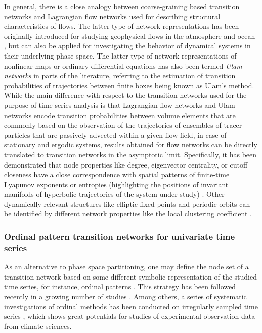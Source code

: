 In general, there is a close analogy between coarse-graining based transition networks and Lagrangian flow networks \cite{Lindner2017,Donner2019} used for describing structural characteristics of flows. The latter type of network representations has been originally introduced for studying geophysical flows in the atmosphere and ocean \cite{Rossi2015,Ser-Giacomi2015}, but can also be applied for investigating the behavior of dynamical systems in their underlying phase space. The latter type of network representations of nonlinear maps or ordinary differential equations has also been termed \emph{Ulam networks} \cite{Shepelyansky2010,Ermann2010,Chakhmakhchyan2013,Ermann2015,Frahm2018} in parts of the literature, referring to the estimation of transition probabilities of trajectories between finite boxes being known as Ulam's method. While the main difference with respect to the transition networks used for the purpose of time series analysis is that Lagrangian flow networks and Ulam networks encode transition probabilities between volume elements that are commonly based on the observation of the trajectories of ensembles of tracer particles that are passively advected within a given flow field, in case of stationary and ergodic systems, results obtained for flow networks can be directly translated to transition networks in the asymptotic limit. Specifically, it has been demonstrated that node properties like degree, eigenvector centrality, or cutoff closeness have a close correspondence with spatial patterns of finite-time Lyapunov exponents or entropies (highlighting the positions of invariant manifolds of hyperbolic trajectories of the system under study) \cite{Ser-Giacomi2015,Lindner2017}. Other dynamically relevant structures like elliptic fixed points and periodic orbits can be identified by different network properties like the local clustering coefficient \cite{Rodriguez-Mendez2017}.


		\subsubsection{Ordinal pattern transition networks for univariate time series} \label{sec:OPtransition}
		As an alternative to phase space partitioning, one may define the node set of a transition network based on some different symbolic representation of the studied time series, for instance, ordinal patterns \cite{Li2008,McCullough2015}. This strategy has been followed recently in a growing number of studies \cite{Small2013,McCullough2015,Kulp2016b,McCullough2017b,Small2018}. Among others, a series of systematic investigations of ordinal methods has been conducted on irregularly sampled time series \cite{Kulp2016a,McCullough2016,Sakellariou2016}, which shows great potentials for studies of experimental observation data from climate sciences. 

